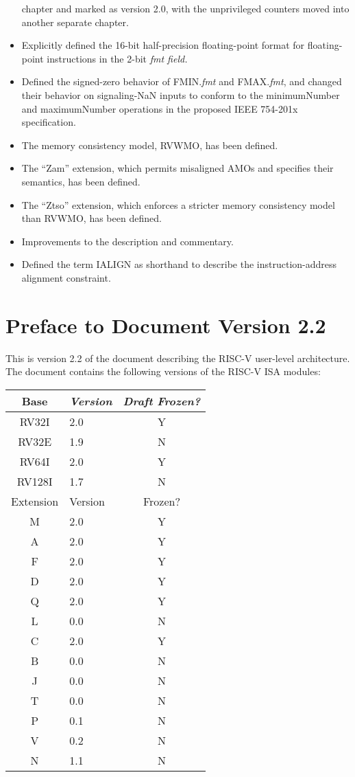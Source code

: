 \begin{itemize}
  chapter and marked as version 2.0, with the unprivileged counters
  moved into another separate chapter.
\item Explicitly defined the 16-bit half-precision floating-point
  format for floating-point instructions in the 2-bit {\em fmt field.}
\item Defined the signed-zero behavior of FMIN.{\em fmt} and FMAX.{\em fmt},
  and changed their behavior on signaling-NaN inputs to conform to the
  minimumNumber and maximumNumber operations in the proposed IEEE 754-201x
  specification.
\item The memory consistency model, RVWMO, has been defined.
\item The ``Zam'' extension, which permits misaligned AMOs and specifies their semantics, has been defined.
\item The ``Ztso'' extension, which enforces a stricter memory consistency model than RVWMO, has been defined.
\item Improvements to the description and commentary.
\item Defined the term IALIGN as shorthand to describe the instruction-address
  alignment constraint.
\end{itemize}

\section*{Preface to Document Version 2.2}

This is version 2.2 of the document describing the RISC-V
user-level architecture.  The document contains the following
versions of the RISC-V ISA modules:
\begin{table}[hbt]
  \centering
  \begin{tabular}{|c|l|c|}
    \hline
    Base     & \em Version & \em Draft Frozen? \\
    \hline
    RV32I    & 2.0 & Y \\
    RV32E    & 1.9 & N \\
    RV64I    & 2.0 & Y \\
    RV128I   & 1.7 & N \\
    \hline
    Extension & Version & Frozen? \\
    \hline
    M        & 2.0 & Y \\
    A        & 2.0 & Y \\
    F        & 2.0 & Y \\
    D        & 2.0 & Y \\
    Q        & 2.0 & Y \\
    L        & 0.0 & N \\
    C        & 2.0 & Y \\
    B        & 0.0 & N \\
    J        & 0.0 & N \\
    T        & 0.0 & N \\
    P        & 0.1 & N \\
    V        & 0.2 & N \\
    N        & 1.1 & N \\
    \hline
  \end{tabular}
\end{table}

